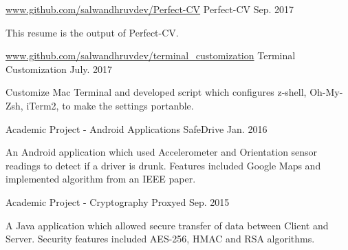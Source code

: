 

\begin{cventries}

  \cventry
    {\url{www.github.com/salwandhruvdev/Perfect-CV}} %
    {Perfect-CV} %
    {Sep. 2017} %
    {}
    {
      \begin{cvitems} %
        \item {This resume is the output of Perfect-CV.}
      \end{cvitems}
    }

  \cventry
    {\url{www.github.com/salwandhruvdev/terminal_customization}} %
    {Terminal Customization} %
    {July. 2017} %
    {}
    {
      \begin{cvitems} %
        \item {Customize Mac Terminal and developed script which configures z-shell, Oh-My-Zsh, iTerm2, to make the settings portanble.}
      \end{cvitems}
    }


  \cventry
    {Academic Project - Android Applications} %
    {SafeDrive} %
    {Jan. 2016} %
    {}
    {
      \begin{cvitems} %
        \item {An Android application which used Accelerometer and Orientation sensor readings to detect if a driver is drunk.
        Features included Google Maps and implemented algorithm from an IEEE paper.}
      \end{cvitems}
    }


  \cventry
    {Academic Project - Cryptography} %
    {Proxyed} %
    {Sep. 2015} %
    {}
    {
      \begin{cvitems} %
        \item {A Java application which allowed secure transfer of data between Client and Server. Security features included AES-256, HMAC and RSA algorithms.}
      \end{cvitems}
    }

\end{cventries}
